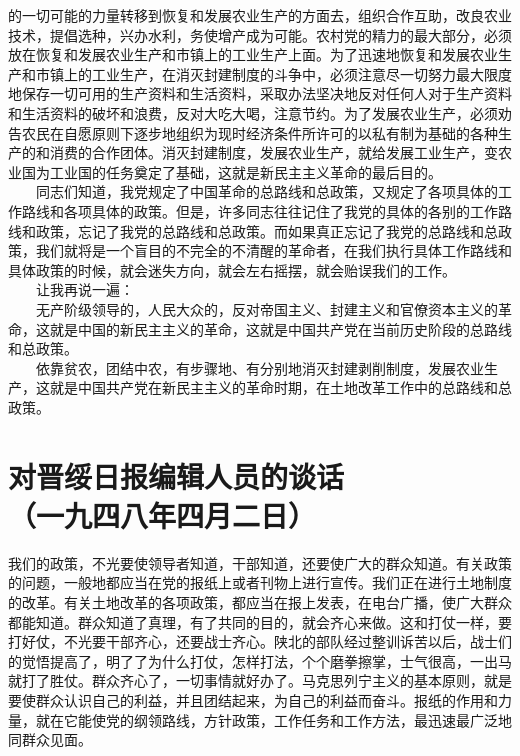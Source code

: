 \documentclass[cn,11pt,chinese]{elegantbook}
\def\myformat#1{\hfil\hfil #1}
\begin{document}
的一切可能的力量转移到恢复和发展农业生产的方面去，组织合作互助，改良农业技术，提倡选种，兴办水利，务使增产成为可能。农村党的精力的最大部分，必须放在恢复和发展农业生产和市镇上的工业生产上面。为了迅速地恢复和发展农业生产和市镇上的工业生产，在消灭封建制度的斗争中，必须注意尽一切努力最大限度地保存一切可用的生产资料和生活资料，采取办法坚决地反对任何人对于生产资料和生活资料的破坏和浪费，反对大吃大喝，注意节约。为了发展农业生产，必须劝告农民在自愿原则下逐步地组织为现时经济条件所许可的以私有制为基础的各种生产的和消费的合作团体。消灭封建制度，发展农业生产，就给发展工业生产，变农业国为工业国的任务奠定了基础，这就是新民主主义革命的最后目的。\\
　　同志们知道，我党规定了中国革命的总路线和总政策，又规定了各项具体的工作路线和各项具体的政策。但是，许多同志往往记住了我党的具体的各别的工作路线和政策，忘记了我党的总路线和总政策。而如果真正忘记了我党的总路线和总政策，我们就将是一个盲目的不完全的不清醒的革命者，在我们执行具体工作路线和具体政策的时候，就会迷失方向，就会左右摇摆，就会贻误我们的工作。\\
　　让我再说一遍：\\
　　无产阶级领导的，人民大众的，反对帝国主义、封建主义和官僚资本主义的革命，这就是中国的新民主主义的革命，这就是中国共产党在当前历史阶段的总路线和总政策。\\
　　依靠贫农，团结中农，有步骤地、有分别地消灭封建剥削制度，发展农业生产，这就是中国共产党在新民主主义的革命时期，在土地改革工作中的总路线和总政策。\\
\newpage\section*{\myformat{对晋绥日报编辑人员的谈话}\\\myformat{（一九四八年四月二日）}}
我们的政策，不光要使领导者知道，干部知道，还要使广大的群众知道。有关政策的问题，一般地都应当在党的报纸上或者刊物上进行宣传。我们正在进行土地制度的改革。有关土地改革的各项政策，都应当在报上发表，在电台广播，使广大群众都能知道。群众知道了真理，有了共同的目的，就会齐心来做。这和打仗一样，要打好仗，不光要干部齐心，还要战士齐心。陕北的部队经过整训诉苦以后，战士们的觉悟提高了，明了了为什么打仗，怎样打法，个个磨拳擦掌，士气很高，一出马就打了胜仗。群众齐心了，一切事情就好办了。马克思列宁主义的基本原则，就是要使群众认识自己的利益，并且团结起来，为自己的利益而奋斗。报纸的作用和力量，就在它能使党的纲领路线，方针政策，工作任务和工作方法，最迅速最广泛地同群众见面。\\
\end{document}
